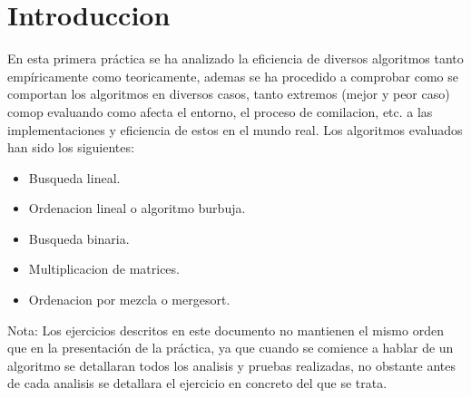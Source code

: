 \section{Introduccion}

En esta primera práctica se ha analizado la eficiencia de diversos algoritmos tanto empíricamente como teoricamente, ademas se ha procedido a comprobar como se comportan los algoritmos en diversos casos, tanto extremos (mejor y peor caso) comop evaluando como afecta el entorno, el proceso de comilacion, etc. a las implementaciones y eficiencia de estos en el mundo real. Los algoritmos evaluados han sido los siguientes:

\begin{itemize}
\item Busqueda lineal.
\item Ordenacion lineal o algoritmo burbuja.
\item Busqueda binaria.
\item Multiplicacion de matrices.
\item Ordenacion por mezcla o mergesort.
\end{itemize}


Nota: Los ejercicios descritos en este documento no mantienen el mismo orden que en la presentación de la práctica, ya que cuando se comience a hablar de un algoritmo se detallaran todos los analisis y pruebas realizadas, no obstante antes de cada analisis se detallara el ejercicio en concreto del que se trata.